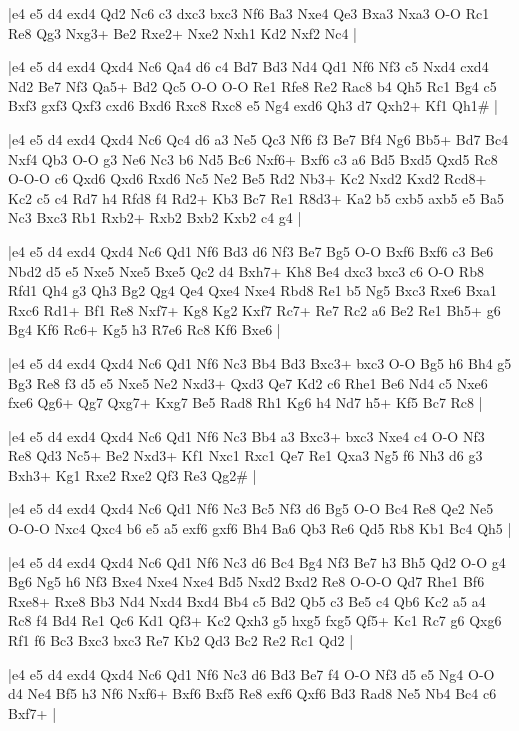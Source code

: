 \whitename{}
\blackname{}
\makegametitle
|e4 e5 d4 exd4 Qd2 Nc6 c3 dxc3 bxc3 Nf6 Ba3 Nxe4 Qe3 Bxa3 Nxa3 O-O Rc1 Re8 Qg3 Nxg3+ Be2 Rxe2+ Nxe2 Nxh1 Kd2 Nxf2 Nc4  |

\whitename{}
\blackname{}
\makegametitle
|e4 e5 d4 exd4 Qxd4 Nc6 Qa4 d6 c4 Bd7 Bd3 Nd4 Qd1 Nf6 Nf3 c5 Nxd4 cxd4 Nd2 Be7 Nf3 Qa5+ Bd2 Qc5 O-O O-O Re1 Rfe8 Re2 Rac8 b4 Qh5 Rc1 Bg4 c5 Bxf3 gxf3 Qxf3 cxd6 Bxd6 Rxc8 Rxc8 e5 Ng4 exd6 Qh3 d7 Qxh2+ Kf1 Qh1\#  |

\whitename{}
\blackname{}
\makegametitle
|e4 e5 d4 exd4 Qxd4 Nc6 Qc4 d6 a3 Ne5 Qc3 Nf6 f3 Be7 Bf4 Ng6 Bb5+ Bd7 Bc4 Nxf4 Qb3 O-O g3 Ne6 Nc3 b6 Nd5 Bc6 Nxf6+ Bxf6 c3 a6 Bd5 Bxd5 Qxd5 Rc8 O-O-O c6 Qxd6 Qxd6 Rxd6 Nc5 Ne2 Be5 Rd2 Nb3+ Kc2 Nxd2 Kxd2 Rcd8+ Kc2 c5 c4 Rd7 h4 Rfd8 f4 Rd2+ Kb3 Bc7 Re1 R8d3+ Ka2 b5 cxb5 axb5 e5 Ba5 Nc3 Bxc3 Rb1 Rxb2+ Rxb2 Bxb2 Kxb2 c4 g4  |

\whitename{}
\blackname{}
\makegametitle
|e4 e5 d4 exd4 Qxd4 Nc6 Qd1 Nf6 Bd3 d6 Nf3 Be7 Bg5 O-O Bxf6 Bxf6 c3 Be6 Nbd2 d5 e5 Nxe5 Nxe5 Bxe5 Qc2 d4 Bxh7+ Kh8 Be4 dxc3 bxc3 c6 O-O Rb8 Rfd1 Qh4 g3 Qh3 Bg2 Qg4 Qe4 Qxe4 Nxe4 Rbd8 Re1 b5 Ng5 Bxc3 Rxe6 Bxa1 Rxc6 Rd1+ Bf1 Re8 Nxf7+ Kg8 Kg2 Kxf7 Rc7+ Re7 Rc2 a6 Be2 Re1 Bh5+ g6 Bg4 Kf6 Rc6+ Kg5 h3 R7e6 Rc8 Kf6 Bxe6  |

\whitename{}
\blackname{}
\makegametitle
|e4 e5 d4 exd4 Qxd4 Nc6 Qd1 Nf6 Nc3 Bb4 Bd3 Bxc3+ bxc3 O-O Bg5 h6 Bh4 g5 Bg3 Re8 f3 d5 e5 Nxe5 Ne2 Nxd3+ Qxd3 Qe7 Kd2 c6 Rhe1 Be6 Nd4 c5 Nxe6 fxe6 Qg6+ Qg7 Qxg7+ Kxg7 Be5 Rad8 Rh1 Kg6 h4 Nd7 h5+ Kf5 Bc7 Rc8  |

\whitename{}
\blackname{}
\makegametitle
|e4 e5 d4 exd4 Qxd4 Nc6 Qd1 Nf6 Nc3 Bb4 a3 Bxc3+ bxc3 Nxe4 c4 O-O Nf3 Re8 Qd3 Nc5+ Be2 Nxd3+ Kf1 Nxc1 Rxc1 Qe7 Re1 Qxa3 Ng5 f6 Nh3 d6 g3 Bxh3+ Kg1 Rxe2 Rxe2 Qf3 Re3 Qg2\#  |

\whitename{}
\blackname{}
\makegametitle
|e4 e5 d4 exd4 Qxd4 Nc6 Qd1 Nf6 Nc3 Bc5 Nf3 d6 Bg5 O-O Bc4 Re8 Qe2 Ne5 O-O-O Nxc4 Qxc4 b6 e5 a5 exf6 gxf6 Bh4 Ba6 Qb3 Re6 Qd5 Rb8 Kb1 Bc4 Qh5  |

\whitename{}
\blackname{}
\makegametitle
|e4 e5 d4 exd4 Qxd4 Nc6 Qd1 Nf6 Nc3 d6 Bc4 Bg4 Nf3 Be7 h3 Bh5 Qd2 O-O g4 Bg6 Ng5 h6 Nf3 Bxe4 Nxe4 Nxe4 Bd5 Nxd2 Bxd2 Re8 O-O-O Qd7 Rhe1 Bf6 Rxe8+ Rxe8 Bb3 Nd4 Nxd4 Bxd4 Bb4 c5 Bd2 Qb5 c3 Be5 c4 Qb6 Kc2 a5 a4 Rc8 f4 Bd4 Re1 Qc6 Kd1 Qf3+ Kc2 Qxh3 g5 hxg5 fxg5 Qf5+ Kc1 Rc7 g6 Qxg6 Rf1 f6 Bc3 Bxc3 bxc3 Re7 Kb2 Qd3 Bc2 Re2 Rc1 Qd2  |

\whitename{}
\blackname{}
\makegametitle
|e4 e5 d4 exd4 Qxd4 Nc6 Qd1 Nf6 Nc3 d6 Bd3 Be7 f4 O-O Nf3 d5 e5 Ng4 O-O d4 Ne4 Bf5 h3 Nf6 Nxf6+ Bxf6 Bxf5 Re8 exf6 Qxf6 Bd3 Rad8 Ne5 Nb4 Bc4 c6 Bxf7+  |

